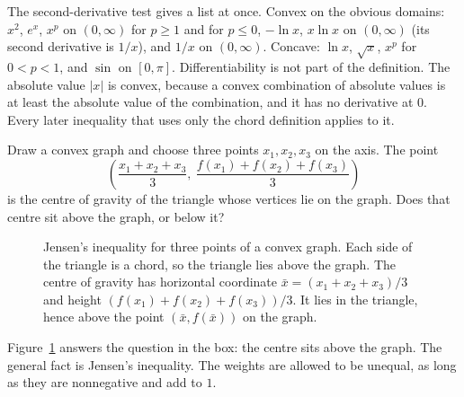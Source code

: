 \begin{examplex}
The second-derivative test gives a list at once. Convex on the obvious domains: $x^2$, $e^x$, $x^p$ on $(0,\infty)$ for $p\ge1$ and for $p\le0$, $-\ln x$, $x\ln x$ on $(0,\infty)$ (its second derivative is $1/x$), and $1/x$ on $(0,\infty)$. Concave: $\ln x$, $\sqrt x$, $x^p$ for $0<p<1$, and $\sin$ on $[0,\pi]$. Differentiability is not part of the definition. The absolute value $|x|$ is convex, because a convex combination of absolute values is at least the absolute value of the combination, and it has no derivative at $0$. Every later inequality that uses only the chord definition applies to it.
\end{examplex}

\begin{think}
Draw a convex graph and choose three points $x_1,x_2,x_3$ on the axis. The point
\[
\left(\frac{x_1+x_2+x_3}3,\ \frac{f(x_1)+f(x_2)+f(x_3)}3\right)
\]
is the centre of gravity of the triangle whose vertices lie on the graph. Does that centre sit above the graph, or below it?
\end{think}

\begin{figure}[ht]
\centering
{}
\caption{Jensen's inequality for three points of a convex graph. Each side of the triangle is a chord, so the triangle lies above the graph. The centre of gravity has horizontal coordinate $\bar x=(x_1+x_2+x_3)/3$ and height $(f(x_1)+f(x_2)+f(x_3))/3$. It lies in the triangle, hence above the point $(\bar x,f(\bar x))$ on the graph.}
\label{fig:jensen}
\end{figure}

Figure~\ref{fig:jensen} answers the question in the box: the centre sits above the graph. The general fact is Jensen's inequality. The weights are allowed to be unequal, as long as they are nonnegative and add to $1$.

